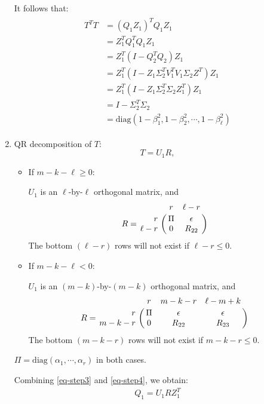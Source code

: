 \begin{enumerate}
It follows that:
\begin{align} \label{eq-step3b}
	\begin{split}
	T^{T}T &= (Q_{1}Z_{1})^{T}Q_{1}Z_{1} \\
		   &= Z_{1}^{T}Q_{1}^{T}Q_{1}Z_{1} \\
		   &= Z_{1}^{T}(I - Q_{2}^{T}Q_{2})Z_{1} \\
		   &= Z_{1}^{T}(I - Z_{1}\Sigma_{2}^{T}V_{1}^{T}V_{1}\Sigma_{2}Z^{T})Z_{1} \\
		   &= Z_{1}^{T}(I - Z_{1}\Sigma_{2}^{T}\Sigma_{2}Z_{1}^{T})Z_{1} \\
		   &= I - \Sigma_{2}^{T}\Sigma_{2} \\
		   &= \mbox{diag}(1-\beta_{1}^{2}, 1-\beta_{2}^{2}, \cdots, 1-\beta_{\ell}^{2})
	\end{split}
\end{align}

\item QR decomposition of $T$:
\begin{equation} \label{eq-step4}
T = U_{1}R,
\end{equation}

\begin{itemize}
	\item If $m - k - \ell \geq 0$:
	
	$U_{1}$ is an $\ell$-by-$\ell$ orthogonal matrix, and
	\begin{equation} \label{eq-R-block-case1}
    R = \bordermatrix{ & r & \ell-r \cr
    \hfill r & \Pi & \epsilon \cr
    \hfill \ell-r & 0 & R_{22}}
    \end{equation}
	The bottom $(\ell-r)$ rows will not exist if $\ell-r \leq 0$.
	
	\item If $m - k - \ell < 0$:
	
	$U_{1}$ is an $(m-k)$-by-$(m-k)$ orthogonal matrix, and
    \begin{equation} \label{eq-R-block-case2}
    R = \bordermatrix{ & r & m-k-r & \ell-m+k \cr
    \hfill r & \Pi & \epsilon & \epsilon \cr
    \hfill m-k-r & 0 & R_{22} & R_{23} }
    \end{equation}
    The bottom $(m-k-r)$ rows will not exist if $m-k-r \leq 0$.
\end{itemize}

$\Pi = \mbox{diag}(\alpha_{1}, \cdots, \alpha_{r})$ in both cases. 
                    
Combining \eqref{eq-step3} and \eqref{eq-step4}, we obtain:
\begin{align} \label{eq-q_1-case1}
Q_1 = U_{1}RZ_{1}^{T}
\end{align}


\end{enumerate}
